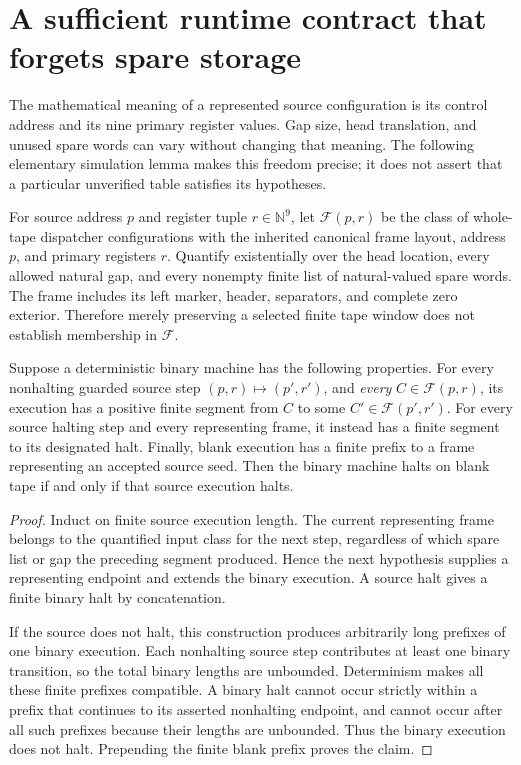 \section{A sufficient runtime contract that forgets spare storage}
\label{sec:frame-quotient}

The mathematical meaning of a represented source configuration is its
control address and its nine primary register values. Gap size, head
translation, and unused spare words can vary without changing that
meaning. The following elementary simulation lemma makes this freedom
precise; it does not assert that a particular unverified table satisfies
its hypotheses.

For source address $p$ and register tuple $r\in\mathbb N^9$, let
$\mathcal F(p,r)$ be the class of whole-tape dispatcher configurations
with the inherited canonical frame layout, address $p$, and primary
registers $r$. Quantify existentially over the head location, every
allowed natural gap, and every nonempty finite list of natural-valued
spare words. The frame includes its left marker, header, separators,
and complete zero exterior. Therefore merely preserving a selected
finite tape window does not establish membership in $\mathcal F$.

\begin{theorem}
\label{thm:frame-quotient}
Suppose a deterministic binary machine has the following properties.
For every nonhalting guarded source step $(p,r)\mapsto(p',r')$, and
\emph{every} $C\in\mathcal F(p,r)$, its execution has a positive finite
segment from $C$ to some $C'\in\mathcal F(p',r')$. For every source
halting step and every representing frame, it instead has a finite
segment to its designated halt. Finally, blank execution has a finite
prefix to a frame representing an accepted source seed. Then the binary
machine halts on blank tape if and only if that source execution halts.
\end{theorem}

\begin{proof}
Induct on finite source execution length. The current representing frame
belongs to the quantified input class for the next step, regardless of
which spare list or gap the preceding segment produced. Hence the next
hypothesis supplies a representing endpoint and extends the binary
execution. A source halt gives a finite binary halt by concatenation.

If the source does not halt, this construction produces arbitrarily
long prefixes of one binary execution. Each nonhalting source step
contributes at least one binary transition, so the total binary lengths
are unbounded. Determinism makes all these finite prefixes compatible.
A binary halt cannot occur strictly within a prefix that continues to
its asserted nonhalting endpoint, and cannot occur after all such
prefixes because their lengths are unbounded. Thus the binary execution
does not halt. Prepending the finite blank prefix proves the claim.
\end{proof}

